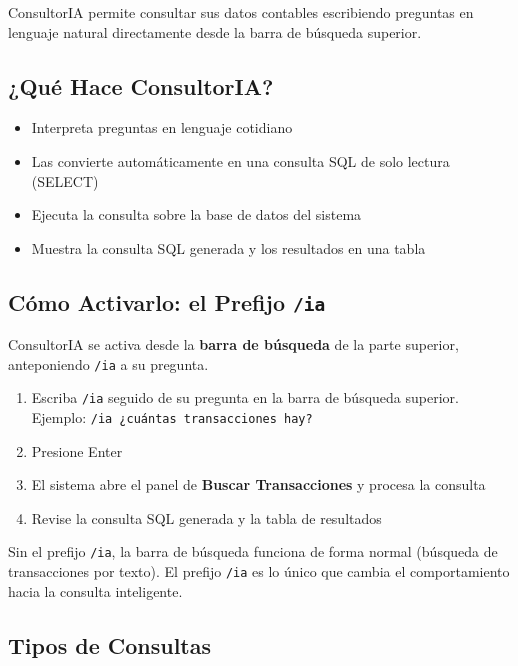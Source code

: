 ConsultorIA permite consultar sus datos contables escribiendo preguntas en lenguaje natural directamente desde la barra de búsqueda superior.

\subsection{¿Qué Hace ConsultorIA?}

\begin{itemize}
    \item Interpreta preguntas en lenguaje cotidiano
    \item Las convierte automáticamente en una consulta SQL de solo lectura (SELECT)
    \item Ejecuta la consulta sobre la base de datos del sistema
    \item Muestra la consulta SQL generada y los resultados en una tabla
\end{itemize}

\subsection{Cómo Activarlo: el Prefijo \texttt{/ia}}

ConsultorIA se activa desde la \textbf{barra de búsqueda} de la parte superior, anteponiendo \texttt{/ia} a su pregunta.

\begin{enumerate}
    \item Escriba \texttt{/ia} seguido de su pregunta en la barra de búsqueda superior. \\
    Ejemplo: \texttt{/ia ¿cuántas transacciones hay?}
    \item Presione Enter
    \item El sistema abre el panel de \textbf{Buscar Transacciones} y procesa la consulta
    \item Revise la consulta SQL generada y la tabla de resultados
\end{enumerate}

\begin{notebox}
Sin el prefijo \texttt{/ia}, la barra de búsqueda funciona de forma normal (búsqueda de transacciones por texto). El prefijo \texttt{/ia} es lo único que cambia el comportamiento hacia la consulta inteligente.
\end{notebox}

\subsection{Tipos de Consultas}

